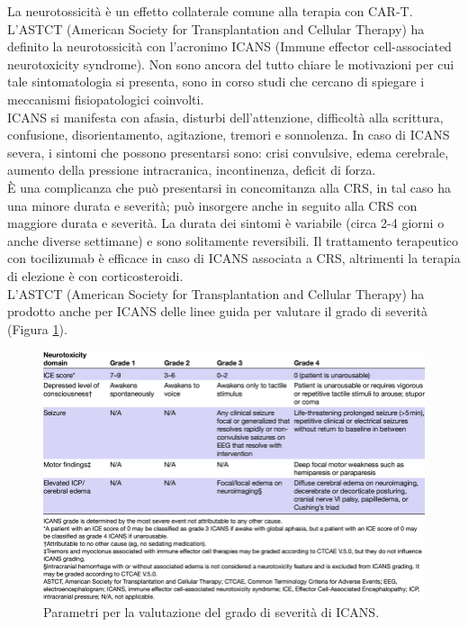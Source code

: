 La neurotossicità è un effetto collaterale comune alla terapia con CAR-T. 
L’ASTCT (American Society for Transplantation and Cellular Therapy) ha definito la neurotossicità con 
l’acronimo ICANS (Immune effector cell-associated neurotoxicity syndrome). Non sono ancora del tutto chiare le 
motivazioni per cui tale sintomatologia si presenta, sono in corso studi che cercano di spiegare i meccanismi 
fisiopatologici coinvolti\cite{EMATOCART}.\\
ICANS si manifesta con afasia, disturbi dell’attenzione, difficoltà alla scrittura, confusione, disorientamento, 
agitazione, tremori e sonnolenza. In caso di ICANS severa, i sintomi che possono presentarsi sono: crisi convulsive, 
edema cerebrale, aumento della pressione intracranica, incontinenza, deficit di forza\cite{EMATOCART}.\\
È una complicanza che può presentarsi in concomitanza alla CRS, in tal caso ha una minore durata e severità; 
può insorgere anche in seguito alla CRS con maggiore durata e severità. La durata dei sintomi è variabile 
(circa 2-4 giorni o anche diverse settimane) e sono solitamente reversibili. 
Il trattamento terapeutico con tocilizumab è efficace in caso di ICANS associata a CRS, altrimenti la terapia di 
elezione è con corticosteroidi\cite{EMATOCART}.\\
L’ASTCT (American Society for Transplantation and Cellular Therapy) 
ha prodotto anche per ICANS delle linee guida per valutare il grado di severità (Figura \ref{fig:FIGURE_5.5})\cite{LEE2019625}.

\begin{figure}[H]
    \begin{center}
    \vspace{-3mm}
    \includegraphics[width=0.8\columnwidth]{img/ICANS.png}
    \end{center}
    \caption{Parametri per la valutazione del grado di severità di ICANS.
    \cite{ICANS}}
    \label{fig:FIGURE_5.5}
\end{figure}

